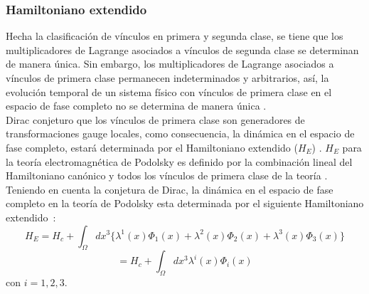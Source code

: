 \documentclass[a4paper,12pt]{article}
\begin{document}
\subsubsection{Hamiltoniano extendido}
Hecha la clasificación de vínculos en primera y segunda clase, se tiene que los multiplicadores de Lagrange asociados a vínculos de segunda clase se determinan de manera única. Sin embargo, los multiplicadores de Lagrange asociados a vínculos de primera clase permanecen indeterminados y arbitrarios, así, la evolución temporal de un sistema físico con vínculos de primera clase en el espacio de fase completo no se determina de manera única \cite{dirac,puebla,Merilin}. 
\\

Dirac conjeturo que los vínculos de primera clase son generadores de \mbox{transformaciones} gauge locales, como consecuencia, la dinámica en el espacio de fase completo, estará determinada por el Hamiltoniano extendido ($H_E$) \cite{dirac,puebla,Merilin}. $H_E$ para la teoría electromagnética de Podolsky es definido por la combinación lineal del Hamiltoniano canónico y todos los vínculos de primera clase de la teoría . \mbox{Teniendo} en cuenta la conjetura de Dirac, la dinámica en el espacio de fase \mbox{completo} en la teoría de Podolsky esta determinada por el siguiente Hamiltoniano \mbox{extendido \cite{podolsky}:}
\begin{equation}
H_E=H_c+ \int_{\Omega}dx^3\{\lambda^1(x)\Phi_1(x)+\lambda^2(x)\Phi_2(x)+\lambda^3(x)\Phi_3(x)\}
\label{haexs}
\end{equation}
$$=H_c+ \int_{\Omega}dx^3\lambda^i(x)\Phi_i(x)$$
con $i=1,2,3$. 
\\
\end{document}
